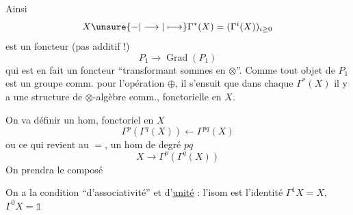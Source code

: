 Ainsi
\[
X\unsure{-|\longrightarrow|\longmapsto}\Gamma^*(X)=(\Gamma^i(X))_{i\geq0}
\]
est un foncteur (pas  additif !)
\[
P_1\longrightarrow\operatorname{Grad}(P_1)
\]
qui est en fait un foncteur
``transformant sommes en $\otimes$''. Comme
tout objet de $P_1$ est un  groupe comm.
pour l'opération $\oplus$, il s'ensuit que
dans chaque $\Gamma^*(X)$ il y a une structure
de $\otimes$-algèbre  comm., fonctorielle en $X$.

On va définir  un hom, fonctoriel en $X$
\[
\Gamma^p(\Gamma^q(X))\longleftarrow\Gamma^{pq}(X)\tag*{($*$)}
\]
ou ce qui revient au $=$, un hom 
de degré $pq$
\[
X\longrightarrow\Gamma^p(\Gamma^q(X))
\]
On prendra le composé

On a la condition ``d'associativité''
et d'\uline{unité} : l'isom  est l'identité 
 $\Gamma^1 X=X$, $\Gamma^0 X=\mathbb{1}$
